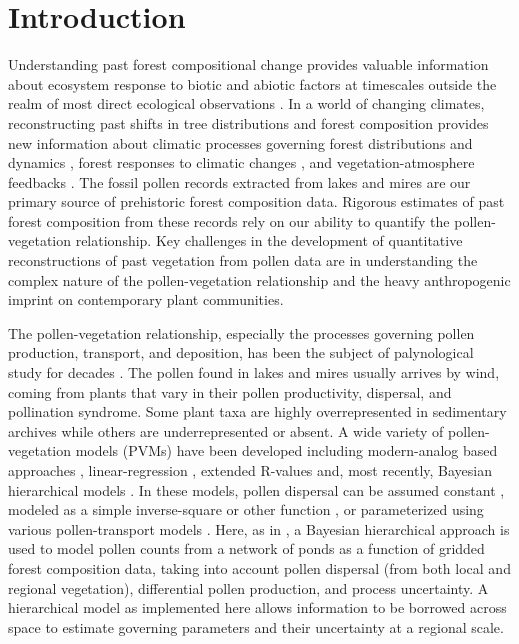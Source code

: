 \documentclass[12pt]{article}
\begin{document}
\section{Introduction}
Understanding past forest compositional change provides valuable
information about ecosystem response to biotic and abiotic factors at
timescales outside the realm of most direct ecological observations
\citep{jackson2007looking}. In a world of changing climates,
reconstructing past shifts in tree distributions and forest
composition provides new information about climatic processes
governing forest distributions and dynamics \citep{goring2015a},
forest responses to climatic changes \citep{williams2009rapid}, and
vegetation-atmosphere feedbacks \citep{matthes2015}. The fossil pollen
records extracted from lakes and mires are our primary source of
prehistoric forest composition data. Rigorous estimates of past forest
composition from these records rely on our ability to quantify the
pollen-vegetation relationship. Key challenges in the development of
quantitative reconstructions of past vegetation from pollen data are
in understanding the complex nature of the pollen-vegetation
relationship and the heavy anthropogenic imprint on contemporary plant
communities.

The pollen-vegetation relationship, especially the processes governing
pollen production, transport, and deposition, has been the subject of
palynological study for decades \citep{tauber1965,
  jacobson1981selection, jackson1994pollen, jackson1999pollen,
  sugita2007theory1, sugita2007theory2, prentice1988records}. The
pollen found in lakes and mires usually arrives by wind, coming from
plants that vary in their pollen productivity, dispersal, and
pollination syndrome. Some plant taxa are highly overrepresented in
sedimentary archives while others are underrepresented or absent. A
wide variety of pollen-vegetation models (PVMs) have been developed
including modern-analog based approaches
\citep{williams2003variations}, linear-regression
\citep{webb1981estimating, bradshaw1985relationships}, extended
R-values \citep{parsons1981statistical, sugita1994pollen,
  sugita2007theory1, sugita2007theory2} and, most recently, Bayesian
hierarchical models \citep{paciorek2009mapping, garreta2010method}.
In these models, pollen dispersal can be assumed constant
\citep{davis1963theory, parsons1981statistical}, modeled as a simple
inverse-square or other function \citep{webb1981estimating,
  calcote1995pollen, jackson1998quantitative}, or parameterized using
various pollen-transport models \citep{prentice1988records,
  sugita2007theory1, sugita2007theory2, jackson1999pollen}. Here, as
in \citet{paciorek2009mapping}, a Bayesian hierarchical approach is
used to model pollen counts from a network of ponds as a function of
gridded forest composition data, taking into account pollen dispersal
(from both local and regional vegetation), differential pollen
production, and process uncertainty. A hierarchical model as
implemented here allows information to be borrowed across space to
estimate governing parameters and their uncertainty at a regional
scale.
\end{document}
